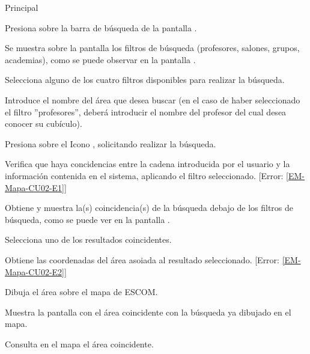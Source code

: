 \begin{UCtrayectoria}{Principal}

	\UCpaso[\UCactor] Presiona sobre la barra de búsqueda de la pantalla .

	\UCpaso Se muestra sobre la pantalla  los filtros de búsqueda (profesores,
	salones, grupos, academias), como se puede observar en la pantalla .

	\UCpaso [\UCactor] Selecciona alguno de los cuatro filtros disponibles para realizar la búsqueda. 

	\UCpaso [\UCactor] Introduce el nombre del área que desea buscar (en el caso de haber seleccionado el filtro ''profesores'',
	deberá introducir el nombre del profesor del cual desea conocer su cubículo).

	\UCpaso [\UCactor] Presiona sobre el Icono , solicitando realizar la búsqueda. 

	\UCpaso Verifica que haya concidencias entre la cadena introducida por el usuario y la información contenida en el sistema,
	aplicando el filtro seleccionado. [Error: \ref{EM-Mapa-CU02-E1}]

	\UCpaso Obtiene y muestra la(s) coincidencia(s) de la búsqueda debajo de los filtros de búsqueda, como se puede ver en la
	pantalla .

	\UCpaso [\UCactor] Selecciona uno de los resultados coincidentes. 

	\UCpaso Obtiene las coordenadas del área asoiada al resultado seleccionado. [Error: \ref{EM-Mapa-CU02-E2}]

	\UCpaso Dibuja el área sobre el mapa de ESCOM. 

	\UCpaso Muestra la pantalla  con el área coincidente con la búsqueda
	ya dibujado en el mapa. 

	\UCpaso [\UCactor] Consulta en el mapa el área coincidente. 


\end{UCtrayectoria}



